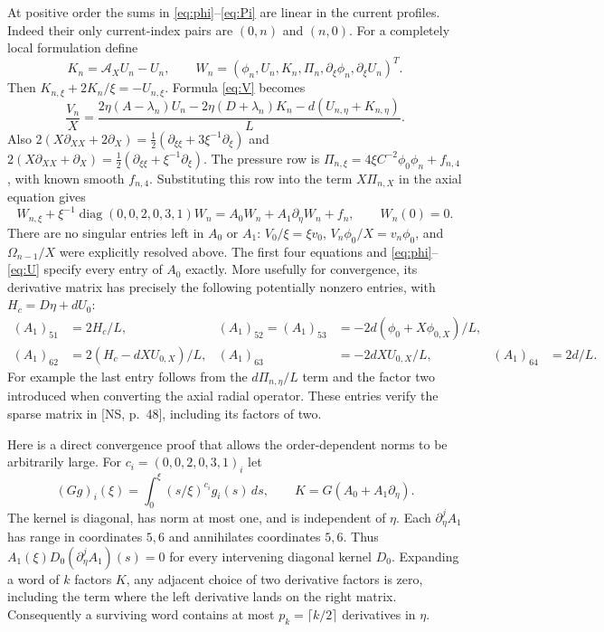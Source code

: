 \documentclass[10pt,a4paper]{article}
\newcommand{\AX}{\mathcal A_X}
\newcommand{\diag}{\operatorname{diag}}
\begin{document}
At positive order the sums in \eqref{eq:phi}--\eqref{eq:Pi} are linear in the
current profiles. Indeed their only current-index pairs are $(0,n)$ and $(n,0)$.
For a completely local formulation define
\[
 K_n=\AX U_n-U_n,\qquad
 W_n=(\phi_n,U_n,K_n,\Pi_n,\partial_\xi\phi_n,\partial_\xi U_n)^T.
\]
Then $K_{n,\xi}+2K_n/\xi=-U_{n,\xi}$. Formula \eqref{eq:V} becomes
\[
 \frac{V_n}{X}=\frac{2\eta(A-\lambda_n)U_n
 -2\eta(D+\lambda_n)K_n-d(U_{n,\eta}+K_{n,\eta})}{L}.
\]
Also
$2(X\partial_{XX}+2\partial_X)=\tfrac12(\partial_{\xi\xi}+3\xi^{-1}\partial_\xi)$
and
$2(X\partial_{XX}+\partial_X)=\tfrac12(\partial_{\xi\xi}+\xi^{-1}\partial_\xi)$.
The pressure row is
$\Pi_{n,\xi}=4\xi C^{-2}\phi_0\phi_n+f_{n,4}$, with known smooth $f_{n,4}$.
Substituting this row into the term $X\Pi_{n,X}$ in the axial equation gives
\begin{equation}\label{eq:volterra}
 W_{n,\xi}+\xi^{-1}\diag(0,0,2,0,3,1)W_n
   =A_0W_n+A_1\partial_\eta W_n+f_n,
 \qquad W_n(0)=0.
\end{equation}
There are no singular entries left in $A_0$ or $A_1$: $V_0/\xi=\xi v_0$,
$V_n\phi_0/X=v_n\phi_0$, and $\Omega_{n-1}/X$ were explicitly resolved above.
The first four equations and \eqref{eq:phi}--\eqref{eq:U} specify every entry
of $A_0$ exactly. More usefully for convergence, its derivative matrix has precisely
the following potentially nonzero entries, with $H_c=D\eta+dU_0$:
\[
\begin{aligned}
(A_1)_{51}&=2H_c/L,&
(A_1)_{52}=(A_1)_{53}&=-2d(\phi_0+X\phi_{0,X})/L,\\
(A_1)_{62}&=2(H_c-dXU_{0,X})/L,&
(A_1)_{63}&=-2dXU_{0,X}/L,&
(A_1)_{64}&=2d/L.
\end{aligned}
\]
For example the last entry follows from the $d\Pi_{n,\eta}/L$ term and the
factor two introduced when converting the axial radial operator. These entries
verify the sparse matrix in [NS, p.~48], including its factors of two.

Here is a direct convergence proof that allows the order-dependent norms to be
arbitrarily large. For $c_i=(0,0,2,0,3,1)_i$ let
\[
(Gg)_i(\xi)=\int_0^\xi(s/\xi)^{c_i}g_i(s)\,ds,
\qquad K=G(A_0+A_1\partial_\eta).
\]
The kernel is diagonal, has norm at most one, and is independent of $\eta$.
Each $\partial_\eta^jA_1$ has range in coordinates $5,6$ and annihilates
coordinates $5,6$. Thus $A_1(\xi)D_0(\partial_\eta^jA_1)(s)=0$ for every
intervening diagonal kernel $D_0$. Expanding a word of $k$ factors $K$,
any adjacent choice of two derivative factors is zero, including the term where
the left derivative lands on the right matrix. Consequently a surviving word
contains at most $p_k=\lceil k/2\rceil$ derivatives in $\eta$.
\end{document}
